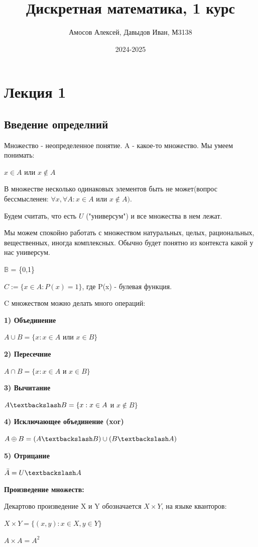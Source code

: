 \documentclass{article}
\title{Дискретная математика, 1 курс}
\author{Амосов Алексей, Давыдов Иван, М3138}
\date{2024-2025}
\begin{document}
\maketitle
\tableofcontents
\pagebreak

\section{Лекция 1}
\subsection{Введение определний}
Множество - неопределенное понятие. A - какое-то множество. Мы умеем понимать:

$x \in A$ или $x \notin A$ 

В множестве несколько одинаковых элементов быть не может(вопрос бессмысленен:  $\forall x, \forall A: x \in  A  $ или $ x \notin A).$

Будем считать, что есть $U$ ("универсум") и все множества в нем лежат.

Мы можем спокойно работать с множеством натуральных, целых, рациональных, вещественных, иногда комплексных. Обычно будет понятно из контекста какой у нас универсум.

$\mathbb{B}$ = \{0,1\}

$C:=\{x \in A: P(x) = 1\}$, где P(x) - булевая функция.

C множеством можно делать много операций:

\textbf{1) Объединение}

$A \cup B = \{x: x \in A$  или $x \in B \}$

\textbf{2) Пересечние}

$A \cap B = \{x: x \in A$ и $x \in B \}$

\textbf{3) Вычитание}

$A \textbackslash B = \{x: x \in A$ и $x \notin B \}$

\textbf{4) Исключающее объединение (xor)}

$A \oplus B = (A \textbackslash B) \cup (B \textbackslash A)$

\textbf{5) Отрицание}

$\bar{A} = U \textbackslash A$

\textbf{Произведение множеств:}

Декартово произведение X и Y обозначается $X \times Y$, на языке кванторов:

 $X \times Y = \{(x,y):x \in X, y \in Y\}$ 
 
$A \times A = A^2$
\end{document}
